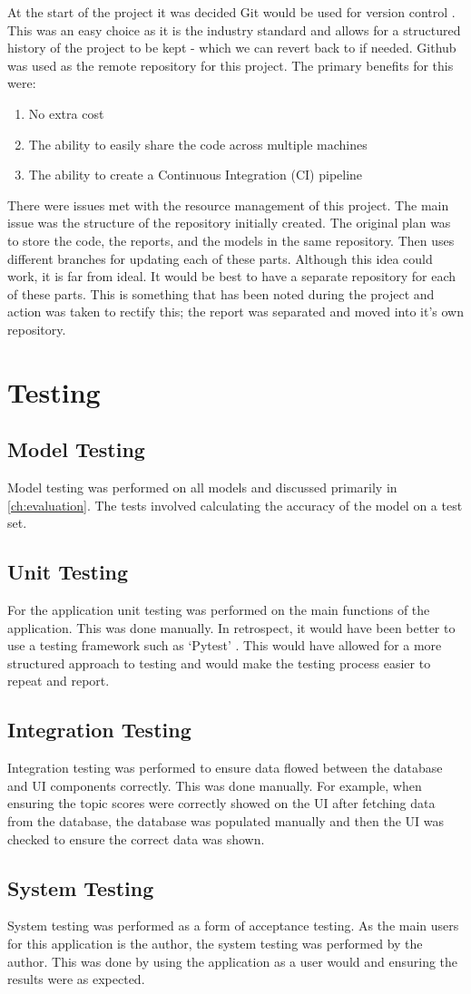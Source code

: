 At the start of the project it was decided Git would be used for version control \cite{git}. This was an easy choice as it is the industry standard
and allows for a structured history of the project to be kept - which we can revert back to if needed. Github was used as the
remote repository for this project. The primary benefits for this were:
\begin{enumerate}
    \item No extra cost
    \item The ability to easily share the code across multiple machines
    \item The ability to create a Continuous Integration (CI) pipeline
\end{enumerate}

There were issues met with the resource management of this project. The main issue was the structure of the repository initially created.
The original plan was to store the code, the reports, and the models in the same repository. Then uses different branches for
updating each of these parts. Although this idea could work, it is far from ideal. It would be best to have a separate repository for
each of these parts. This is something that has been noted during the project and action was taken to rectify this; the report was
separated and moved into it's own repository.

\section{Testing}
\subsection{Model Testing}
Model testing was performed on all models and discussed primarily in \cref{ch:evaluation}. The tests involved calculating the accuracy
of the model on a test set.
\subsection{Unit Testing}
For the application unit testing was performed on the main functions of the application. This was done manually. In retrospect, it would
have been better to use a testing framework such as `Pytest' \cite{pytest}. This would have allowed for a more structured approach to testing and would
make the testing process easier to repeat and report.
\subsection{Integration Testing}
Integration testing was performed to ensure data flowed between the database and UI components correctly. This was done manually.
For example, when ensuring the topic scores were correctly showed on the UI after fetching data from the database, the database
was populated manually and then the UI was checked to ensure the correct data was shown.
\subsection{System Testing}
System testing was performed as a form of acceptance testing. As the main users for this application is the author, the system testing
was performed by the author. This was done by using the application as a user would and ensuring the results were as expected.